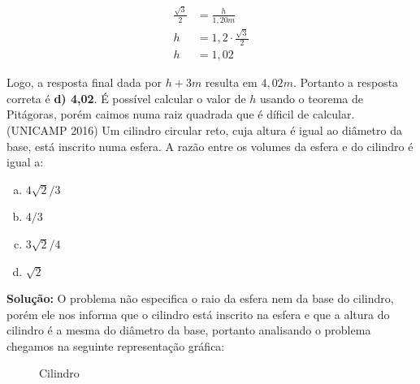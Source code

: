 \begin{multicols*}{2}
    \begin{align}
        \frac{\sqrt{3}}{2} &= \frac{h}{1,20m}\\
        h &= 1,2\cdot\frac{\sqrt{3}}{2}\\
        h &= 1,02
    \end{align}
    
    Logo, a resposta final dada por $h+3m$ resulta em $4,02m$. Portanto a resposta
    correta é \textbf{d) 4,02}. É possível calcular o valor de $h$ usando o 
    teorema de Pitágoras, porém caimos numa raiz quadrada que é díficil de calcular.\\
    
    \execnum (UNICAMP 2016) Um cilindro circular reto, cuja altura é igual ao diâmetro da 
    base, está inscrito numa esfera. A razão entre os volumes 
    da esfera e do cilindro é igual a:
    \begin{enumerate}[a)]
        \item $4\sqrt{2}/3$
        \item $4/3$
        \item $3\sqrt{2}/4$
        \item $\sqrt{2}$
    \end{enumerate}

    \textbf{Solução:} O problema não especifica o raio da esfera nem da base do cilindro, porém 
    ele nos informa que o cilindro está inscrito na esfera e que a altura do cilindro é 
    a mesma do diâmetro da base, portanto analisando o problema chegamos na seguinte representação gráfica:

    \begin{figure}[H]
        \centering
        \caption{Cilindro}
    \end{figure}


\end{multicols*}
